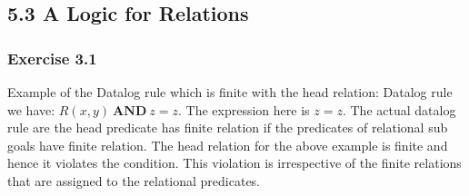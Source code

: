 \documentclass[../../main.tex]{subfiles}
\begin{document}
\subsection*{5.3 A Logic for Relations}

\subsubsection*{Exercise 3.1}

Example of the Datalog rule which is finite with the head relation:
Datalog rule we have: $R(x, y) \ \mathbf{AND} \ z = z$. The expression
here is $z = z$. The actual datalog rule are the head predicate
has finite relation if the predicates of relational sub goals
have finite relation. The head relation for the above example
is finite and hence it violates the condition. This violation
is irrespective of the finite relations that are assigned to
the relational predicates.
\end{document}
